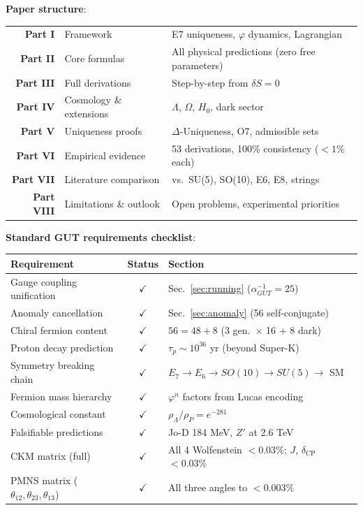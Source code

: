 \documentclass[11pt,a4paper]{article}
\begin{document}
\medskip
\noindent\textbf{Paper structure}:

\smallskip
\begin{center}
\begin{tabular}{r@{:\quad}l@{\qquad}l}
\textbf{Part I} & Framework & E7 uniqueness, $\varphi$ dynamics, Lagrangian \\
\textbf{Part II} & Core formulas & All physical predictions (zero free parameters) \\
\textbf{Part III} & Full derivations & Step-by-step from $\delta S = 0$ \\
\textbf{Part IV} & Cosmology \& extensions & $\Lambda$, $\Omega$, $H_0$, dark sector \\
\textbf{Part V} & Uniqueness proofs & $\Delta$-Uniqueness, O7, admissible sets \\
\textbf{Part VI} & Empirical evidence & 53 derivations, 100\% consistency ($< 1\%$ each) \\
\textbf{Part VII} & Literature comparison & vs.\ SU(5), SO(10), E6, E8, strings \\
\textbf{Part VIII} & Limitations \& outlook & Open problems, experimental priorities \\
\end{tabular}
\end{center}

\medskip
\noindent\textbf{Standard GUT requirements checklist}:

\smallskip
\begin{center}
\begin{tabular}{|l|c|l|}
\hline
\textbf{Requirement} & \textbf{Status} & \textbf{Section} \\
\hline
Gauge coupling unification & $\checkmark$ & Sec.~\ref{sec:running} ($\alpha_{GUT}^{-1} = 25$) \\
Anomaly cancellation & $\checkmark$ & Sec.~\ref{sec:anomaly} (56 self-conjugate) \\
Chiral fermion content & $\checkmark$ & $56 = 48 + 8$ (3 gen.\ $\times$ 16 + 8 dark) \\
Proton decay prediction & $\checkmark$ & $\tau_p \sim 10^{36}$ yr (beyond Super-K) \\
Symmetry breaking chain & $\checkmark$ & $E_7 \to E_6 \to SO(10) \to SU(5) \to$ SM \\
Fermion mass hierarchy & $\checkmark$ & $\varphi^n$ factors from Lucas encoding \\
Cosmological constant & $\checkmark$ & $\rho_\Lambda / \rho_P = e^{-281}$ \\
Falsifiable predictions & $\checkmark$ & Jo-D 184 MeV, $Z'$ at 2.6 TeV \\
CKM matrix (full) & $\checkmark$ & All 4 Wolfenstein $< 0.03\%$; $J$, $\delta_{\text{CP}}$ $< 0.03\%$ \\
PMNS matrix ($\theta_{12}, \theta_{23}, \theta_{13}$) & $\checkmark$ & All three angles to $< 0.003\%$ \\
\hline
\end{tabular}
\end{center}
\end{document}

